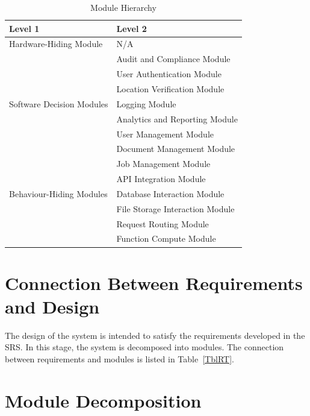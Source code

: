 \documentclass[12pt, titlepage]{article}
\begin{document}
\begin{table}[h!]
  \centering
  \begin{tabular}{p{} p{}}
    \toprule
    \textbf{Level 1}                                       &
    \textbf{Level 2}
    \\
    \midrule

    {Hardware-Hiding Module}                               & N/A
    \\
    \midrule

    \multirow{7}{0.3\textwidth}{Software Decision Modules} & Audit
    and Compliance Module
    \\
    & User Authentication Module      \\
    & Location Verification Module    \\
    & Logging Module                  \\
    & Analytics and Reporting Module  \\
    & User Management Module          \\
    & Document Management Module      \\
    & Job Management Module           \\
    \midrule

    \multirow{3}{0.3\textwidth}{Behaviour-Hiding Modules}  & {API
    Integration Module}
    \\
    & Database Interaction Module     \\
    & File Storage Interaction Module \\
    & Request Routing Module          \\
    & Function Compute Module         \\
    \bottomrule
  \end{tabular}
  \caption{Module Hierarchy}
  \label{TblMH}
\end{table}

\section{Connection Between Requirements and Design} \label{SecConnection}

The design of the system is intended to satisfy the requirements
developed in the SRS. In this stage, the system is decomposed into
modules. The connection between requirements and modules is listed
in Table~\ref{TblRT}.

\section{Module Decomposition} \label{SecMD}
\end{document}
